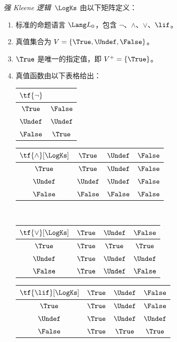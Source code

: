 \documentclass[../../../include/open-logic-section]{subfiles}
\begin{document}
\begin{defn}
\emph{强 Kleene 逻辑}~$\LogKs$ 由以下矩阵定义：
\begin{enumerate}
  \item 标准的命题语言 $\Lang L_0$，包含
  $\lnot$、$\land$、$\lor$、$\lif$。
  \item 真值集合为 $V = \{\True, \Undef, \False\}$。
  \item $\True$ 是唯一的指定值，即 $V^+ = \{\True\}$。
  \item 真值函数由以下表格给出：
  \begin{center}
    \begin{tabular}{c|c}
      $\tf{\lnot}$ & \\
      \hline
      $\True$ & $\False$ \\
      $\Undef$ & $\Undef$ \\
      $\False$ & $\True$
    \end{tabular}
    \quad
    \begin{tabular}{c|ccc}
      $\tf{\land}[\LogKs]$ & $\True$ & $\Undef$ & $\False$ \\
      \hline
      $\True$ & $\True$ & $\Undef$ & $\False$ \\
      $\Undef$ & $\Undef$ & $\Undef$ & $\False$\\
      $\False$ & $\False$ & $\False$ & $\False$
    \end{tabular}
    \\[2ex]
    \begin{tabular}{c|ccc}
      $\tf{\lor}[\LogKs]$ & $\True$ & $\Undef$ & $\False$ \\
      \hline
      $\True$ & $\True$ & $\True$ & $\True$ \\
      $\Undef$ & $\True$ & $\Undef$ & $\Undef$ \\
      $\False$ & $\True$ & $\Undef$ & $\False$
    \end{tabular}
    \quad
    \begin{tabular}{c|ccc}
      $\tf{\lif}[\LogKs]$ & $\True$ & $\Undef$ & $\False$ \\
      \hline
      $\True$ & $\True$ & $\Undef$ & $\False$ \\
      $\Undef$ & $\True$ & $\Undef$ & $\Undef$  \\
      $\False$ & $\True$ & $\True$ & $\True$
    \end{tabular}
  \end{center}
\end{enumerate}
\end{defn}
\end{document}
